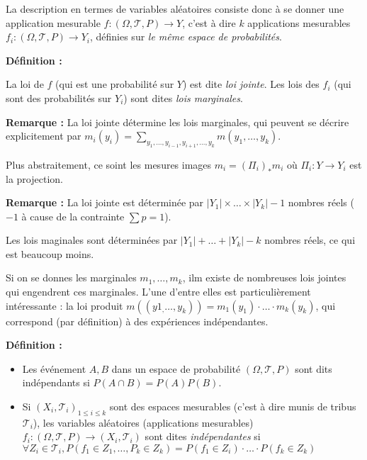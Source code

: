 \documentclass[10pt,a4paper,notitlepage ]{report}
\newcommand{\1}{\mathds 1}
\newenvironment{definition}[1][]{
	
	\textbf{Définition #1 : }
}
{}
\newcounter{th}
\newenvironment{rem}{
	
		\textbf{Remarque :}}{}
\begin{document}
La description en termes de variables aléatoires consiste donc à se donner une application mesurable $f : (\Omega, \mathcal T, P) \rightarrow Y$, c'est à dire $k$ applications mesurables $f_i : (\Omega, \mathcal T, P) \rightarrow Y_i$, définies sur \emph{le même espace de probabilités}.

\begin{definition}
	La loi de $f$ (qui est une probabilité sur $Y$) est dite \emph{loi jointe}. Les lois des $f_i$ (qui sont des probabilités sur $Y_i$) sont dites \emph{lois marginales}.
\end{definition}

\begin{rem}
	La loi jointe détermine les lois marginales, qui peuvent se décrire explicitement par $m_i(y_i)=\underset{y_1,\dots,y_{i-1},y_{i+1},\dots,y_k}{\sum} m(y_1,\dots,y_k)$.
	
	Plus abstraitement, ce soint les mesures images $m_i=(\Pi_i)_*m_i$ où $\Pi_i : Y \rightarrow Y_i$ est la projection.
\end{rem}

\begin{rem}
	La loi jointe est déterminée par $|Y_1|\times\dots\times |Y_k| - 1$ nombres réels ($-1$ à cause de la contrainte $\sum p = 1$).
	
	Les lois maginales sont déterminées par $|Y_1| + \dots + |Y_k| - k$ nombres réels, ce qui est beaucoup moins.
\end{rem}

Si on se donnes les marginales $m_1, \dots, m_k$, ilm existe de nombreuses lois jointes qui engendrent ces marginales. L'une d'entre elles est particulièrement intéressante : la loi produit $m((y1_,\dots,y_k))=m_1(y_1) \cdot \dots \cdot m_k(y_k)$, qui correspond (par définition) à des expériences indépendantes.

\begin{definition}
	\begin{itemize}
		\item Les événement $A,B$ dans un espace de probabilité $(\Omega,\mathcal T, P)$ sont dits indépendants si $P(A\cap B) = P(A)P(B)$.
		\item Si $(X_i, \mathcal T_i)_{1\le i\le k}$ sont des espaces mesurables (c'est à dire munis de tribus $\mathcal T_i$), les variables aléatoires (applications mesurables) $f_i : (\Omega,\mathcal T, P) \rightarrow (X_i,\mathcal T_i)$ sont dites \emph{indépendantes} si $\forall Z_i \in \mathcal T_i, P(f_1\in Z_1, \dots, P_k \in Z_k) = P(f_1 \in Z_i) \cdot \dots \cdot P(f_k \in Z_k)$
	\end{itemize}
\end{definition}
\end{document}
